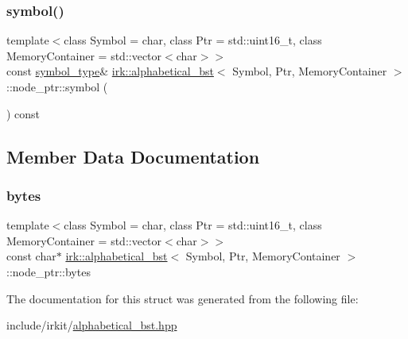 \subsubsection{\texorpdfstring{symbol()}{symbol()}}
{\footnotesize\ttfamily template$<$class Symbol = char, class Ptr = std\+::uint16\+\_\+t, class Memory\+Container = std\+::vector$<$char$>$$>$ \\
const \mbox{\hyperlink{classirk_1_1alphabetical__bst_a296ccb8fa9fa9dce3b3c3beab0a5ca28}{symbol\+\_\+type}}\& \mbox{\hyperlink{classirk_1_1alphabetical__bst}{irk\+::alphabetical\+\_\+bst}}$<$ Symbol, Ptr, Memory\+Container $>$\+::node\+\_\+ptr\+::symbol (\begin{DoxyParamCaption}{ }\end{DoxyParamCaption}) const\hspace{0.3cm}{\ttfamily [inline]}}



\subsection{Member Data Documentation}
\mbox{\label{structirk_1_1alphabetical__bst_1_1node__ptr_afc089ea68fd618ec88d8acb2556d49e8}} 
\subsubsection{\texorpdfstring{bytes}{bytes}}
{\footnotesize\ttfamily template$<$class Symbol = char, class Ptr = std\+::uint16\+\_\+t, class Memory\+Container = std\+::vector$<$char$>$$>$ \\
const char$\ast$ \mbox{\hyperlink{classirk_1_1alphabetical__bst}{irk\+::alphabetical\+\_\+bst}}$<$ Symbol, Ptr, Memory\+Container $>$\+::node\+\_\+ptr\+::bytes}



The documentation for this struct was generated from the following file\+:\begin{DoxyCompactItemize}
\item 
include/irkit/\mbox{\hyperlink{alphabetical__bst_8hpp}{alphabetical\+\_\+bst.\+hpp}}\end{DoxyCompactItemize}
